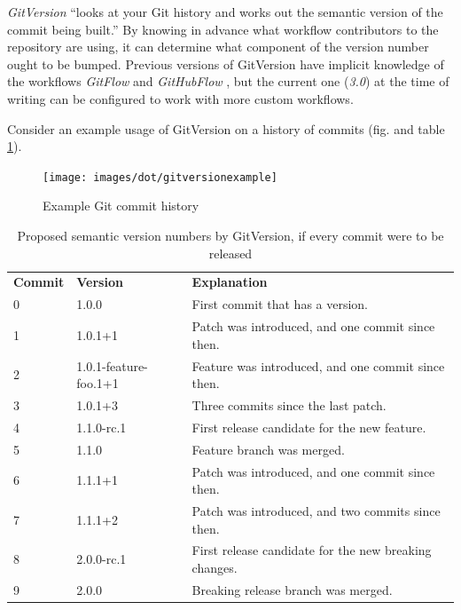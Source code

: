 \documentclass{l4proj}
\begin{document}
\textit{GitVersion} \cite{GitVersion} ``looks at your Git history and
works out the semantic version of the commit being built.'' By knowing
in advance what workflow contributors to the repository are using, it
can determine what component of the version number ought to be bumped.
Previous versions of GitVersion have implicit knowledge of the
workflows \textit{GitFlow} \cite{GitFlow} and \textit{GitHubFlow}
\cite{GitHubFlow}, but the current one (\textit{3.0}) at the time of
writing can be configured to work with more custom workflows.

Consider an example usage of GitVersion on a history of commits (fig.
and table \ref{ExampleGitCommitHistory}).

\begin{figure}[H]
\centering
\texttt{[image: images/dot/gitversionexample]}
\caption{Example Git commit history}
\label{ExampleGitCommitHistory}
\end{figure}

\begin{table}[H]
\centering
\begin{tabular}{|l|l|l|}
\textbf{Commit} & \textbf{Version} & \textbf{Explanation} \\
0      & 1.0.0
& First commit that has a version.                      \\
1      & 1.0.1+1
& Patch was introduced, and one commit since then.      \\
2      & 1.0.1-feature-foo.1+1
& Feature was introduced, and one commit since then.    \\
3      & 1.0.1+3
& Three commits since the last patch.                   \\
4      & 1.1.0-rc.1
& First release candidate for the new feature.          \\
5      & 1.1.0
& Feature branch was merged.                            \\
6      & 1.1.1+1
& Patch was introduced, and one commit since then.      \\
7      & 1.1.1+2
& Patch was introduced, and two commits since then.     \\
8      & 2.0.0-rc.1
& First release candidate for the new breaking changes. \\
9      & 2.0.0
& Breaking release branch was merged.
\end{tabular}
\caption{Proposed semantic version numbers by GitVersion, if every
commit were to be released}
\end{table}
\vspace{-1.5\baselineskip}%
\end{document}
